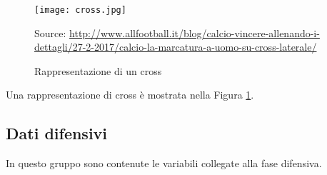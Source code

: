 \begin{itemize}
	\begin{figure}[!ht]
		\begin{center}
			\texttt{[image: cross.jpg]}
			\caption{Rappresentazione di un cross} \label{fig:cross}
			Source: \url{http://www.allfootball.it/blog/calcio-vincere-allenando-i-dettagli/27-2-2017/calcio-la-marcatura-a-uomo-su-cross-laterale/}
		\end{center}
	\end{figure}
	
	Una rappresentazione di cross è mostrata nella Figura \ref{fig:cross}.
\end{itemize}

\subsection{Dati difensivi}

In questo gruppo sono contenute le variabili collegate alla fase difensiva.

